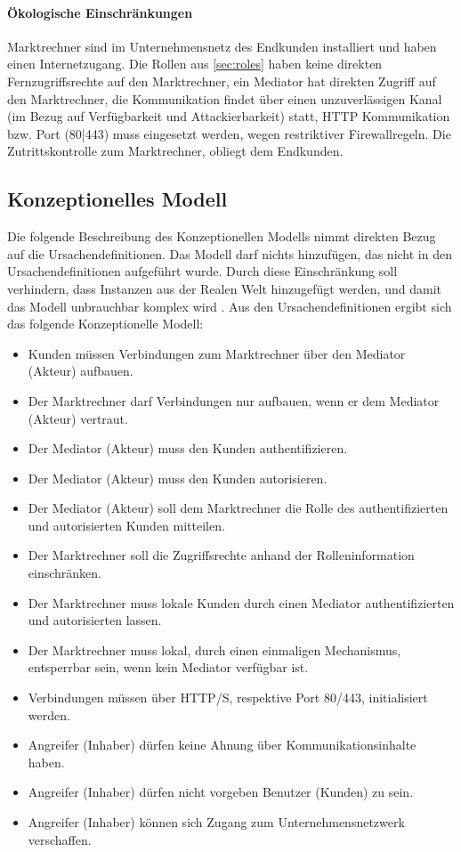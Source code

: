 \documentclass[11pt,a4paper]{report}
\begin{document}
\paragraph{Ökologische Einschränkungen} Marktrechner sind im Unternehmensnetz des Endkunden installiert und haben einen Internetzugang. Die Rollen aus \ref{sec:roles} haben keine direkten Fernzugriffsrechte auf den Marktrechner, ein Mediator hat direkten Zugriff auf den Marktrechner,  die Kommunikation findet über einen unzuverlässigen Kanal (im Bezug auf Verfügbarkeit und Attackierbarkeit) statt, HTTP Kommunikation bzw. Port (80|443) muss eingesetzt werden, wegen restriktiver Firewallregeln. Die Zutrittskontrolle zum Marktrechner, obliegt dem Endkunden.

\subsection{Konzeptionelles Modell}

Die folgende Beschreibung des Konzeptionellen Modells nimmt direkten Bezug auf die Ursachendefinitionen. Das Modell darf nichts hinzufügen, das nicht in den Ursachendefinitionen aufgeführt wurde. Durch diese Einschränkung soll verhindern, dass Instanzen aus der Realen Welt hinzugefügt werden, und damit das Modell unbrauchbar komplex wird \cite{gutmann6}. Aus den Ursachendefinitionen ergibt sich das folgende Konzeptionelle Modell:

\begin{itemize}[leftmargin=*]
\item Kunden müssen Verbindungen zum Marktrechner über den Mediator (Akteur) aufbauen.
\item Der Marktrechner darf Verbindungen nur aufbauen, wenn er dem Mediator (Akteur) vertraut.
\item Der Mediator (Akteur) muss den Kunden authentifizieren.
\item Der Mediator (Akteur) muss den Kunden autorisieren.
\item Der Mediator (Akteur) soll dem Marktrechner die Rolle des authentifizierten und autorisierten Kunden mitteilen.
\item Der Marktrechner soll die Zugriffsrechte anhand der Rolleninformation einschränken.
\item Der Marktrechner muss lokale Kunden durch einen Mediator authentifizierten und autorisierten lassen.
\item Der Marktrechner muss lokal, durch einen einmaligen Mechanismus, entsperrbar sein, wenn kein Mediator verfügbar ist.
\item Verbindungen müssen über HTTP/S, respektive Port 80/443, initialisiert werden.
\item Angreifer (Inhaber) dürfen keine Ahnung über Kommunikationsinhalte haben.
\item Angreifer (Inhaber) dürfen nicht vorgeben Benutzer (Kunden) zu sein.
\item Angreifer (Inhaber) können sich Zugang zum Unternehmensnetzwerk verschaffen.
\end{itemize}
\end{document}
